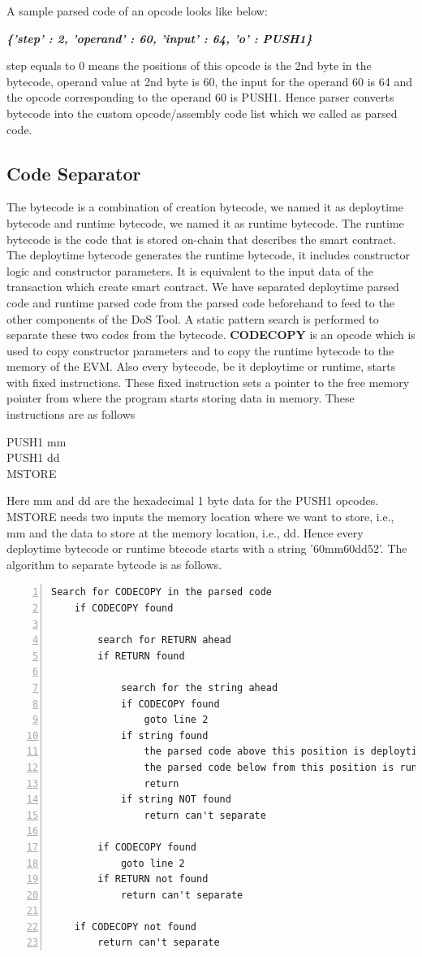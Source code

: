 \noindent A sample parsed code of an opcode looks like below:
\begin{center}
    \textbf{\emph{\{'step' : 2, 'operand' : 60, 'input' : 64, 'o' : PUSH1\}}}
\end{center} 
step equals to 0 means the positions of this opcode is the 2nd byte in the bytecode, operand value at 2nd byte is 60, the input for the operand 60 is 64 and the opcode corresponding to the operand 60 is PUSH1. Hence parser converts bytecode into the custom opcode/assembly code list which we called as parsed code.
\subsection{Code Separator}
The bytecode is a combination of creation bytecode, we named it as deploytime bytecode and runtime bytecode, we named it as runtime bytecode. The runtime bytecode is the code that is stored on-chain that describes the smart contract. The deploytime bytecode generates the runtime bytecode, it includes constructor logic and constructor parameters. It is equivalent to the input data of the transaction which create smart contract\cite{diffop}. We have separated deploytime parsed code and runtime parsed code from the parsed code beforehand to feed to the other components of the DoS Tool. A static pattern search is performed to separate these two codes from the bytecode. \textbf{CODECOPY} is an opcode which is used to copy constructor parameters and to copy the runtime bytecode to the memory of the EVM. Also every bytecode, be it deploytime or runtime, starts with fixed instructions. These fixed instruction sets a pointer to the free memory pointer from where the program starts storing data in memory. These instructions are as follows
\begin{center}
    PUSH1 mm\\
    PUSH1 dd\\
    MSTORE
\end{center}
Here mm and dd are the hexadecimal 1 byte data for the PUSH1 opcodes. MSTORE needs two inputs the memory location where we want to store, i.e., mm and the data to store at the memory location, i.e., dd. Hence every deploytime bytecode or runtime btecode starts with a string '60mm60dd52'. The algorithm to separate bytcode is as follows.
\begin{Verbatim}[numbers=left,xleftmargin=5mm]
    Search for CODECOPY in the parsed code
    if CODECOPY found
    
        search for RETURN ahead
        if RETURN found
        
            search for the string ahead
            if CODECOPY found
                goto line 2
            if string found
                the parsed code above this position is deploytime bytecode
                the parsed code below from this position is runtime bytecode
                return
            if string NOT found
                return can't separate
                
        if CODECOPY found 
            goto line 2
        if RETURN not found
            return can't separate
            
    if CODECOPY not found
        return can't separate
\end{Verbatim}

